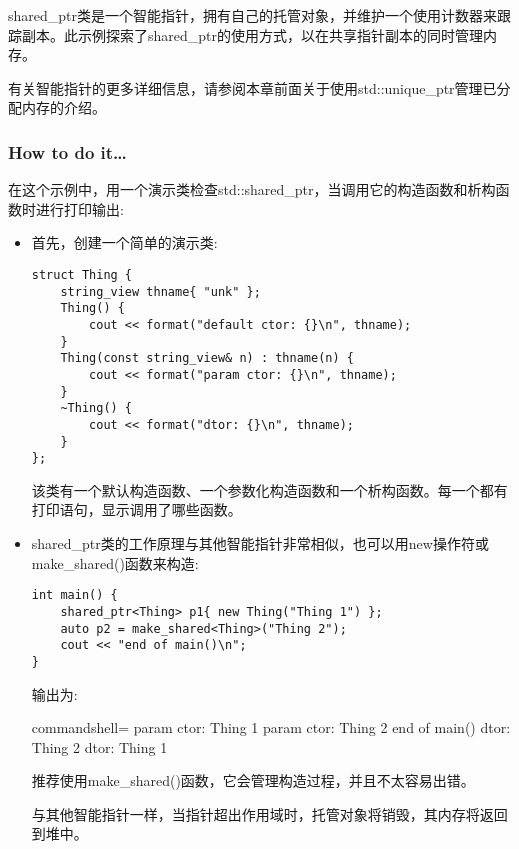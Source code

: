 
shared\_ptr类是一个智能指针，拥有自己的托管对象，并维护一个使用计数器来跟踪副本。此示例探索了shared\_ptr的使用方式，以在共享指针副本的同时管理内存。

\begin{tcolorbox}[colback=webgreen!5!white,colframe=webgreen!75!black,title=Note]
有关智能指针的更多详细信息，请参阅本章前面关于使用std::unique\_ptr管理已分配内存的介绍。
\end{tcolorbox}

\subsubsection{How to do it…}

在这个示例中，用一个演示类检查std::shared\_ptr，当调用它的构造函数和析构函数时进行打印输出:

\begin{itemize}
\item 
首先，创建一个简单的演示类:

\begin{lstlisting}[style=styleCXX]
struct Thing {
	string_view thname{ "unk" };
	Thing() {
		cout << format("default ctor: {}\n", thname);
	}
	Thing(const string_view& n) : thname(n) {
		cout << format("param ctor: {}\n", thname);
	}
	~Thing() {
		cout << format("dtor: {}\n", thname);
	}
};
\end{lstlisting}

该类有一个默认构造函数、一个参数化构造函数和一个析构函数。每一个都有打印语句，显示调用了哪些函数。

\item 
shared\_ptr类的工作原理与其他智能指针非常相似，也可以用new操作符或make\_shared()函数来构造:

\begin{lstlisting}[style=styleCXX]
int main() {
	shared_ptr<Thing> p1{ new Thing("Thing 1") };
	auto p2 = make_shared<Thing>("Thing 2");
	cout << "end of main()\n";
}
\end{lstlisting}

输出为:

\begin{tcblisting}{commandshell={}}
param ctor: Thing 1
param ctor: Thing 2
end of main()
dtor: Thing 2
dtor: Thing 1
\end{tcblisting}

推荐使用make\_shared()函数，它会管理构造过程，并且不太容易出错。

与其他智能指针一样，当指针超出作用域时，托管对象将销毁，其内存将返回到堆中。


\end{itemize}
